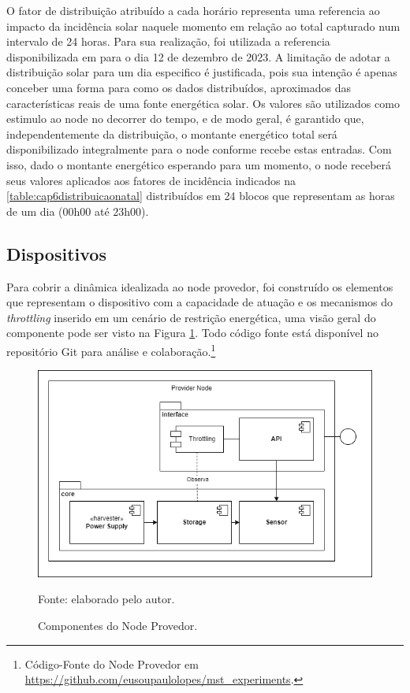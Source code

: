 O fator de distribuição atribuído a cada horário representa uma referencia ao impacto da incidência solar naquele momento em relação ao total capturado num intervalo de 24 horas. Para sua realização, foi utilizada a referencia disponibilizada em  para o dia 12 de dezembro de 2023. A limitação de adotar a distribuição solar para um dia especifico é justificada, pois sua intenção é apenas conceber uma forma para como os dados distribuídos, aproximados das características reais de uma fonte energética solar. Os valores são utilizados como estimulo ao node no decorrer do tempo, e de modo geral, é garantido que, independentemente da distribuição, o montante energético total será disponibilizado integralmente para o node conforme recebe estas entradas. Com isso, dado o montante energético esperando para um momento, o node receberá seus valores aplicados aos fatores de incidência indicados na  \ref{table:cap6distribuicaonatal} distribuídos em 24 blocos que representam as horas de um dia (00h00 até 23h00).



\subsection{Dispositivos}

Para cobrir a dinâmica idealizada ao node provedor, foi construído os elementos que representam o dispositivo com a capacidade de atuação e os mecanismos do \textit{throttling} inserido em um cenário de restrição energética, uma visão geral do componente pode ser visto na Figura \ref{fig:cap6providernode}. Todo código fonte está disponível no repositório Git para análise e colaboração.\footnote{Código-Fonte do Node Provedor em \url{https://github.com/eusoupaulolopes/mst_experiments}.} 

\begin{figure}[H]
	\centering
	
	\caption{Componentes do Node Provedor.}
	\label{fig:cap6providernode}
	\noindent\includegraphics[width=0.75\linewidth]{Imagens/cap6/cap6providernode.png} 
	
	Fonte: elaborado pelo autor.
\end{figure}

